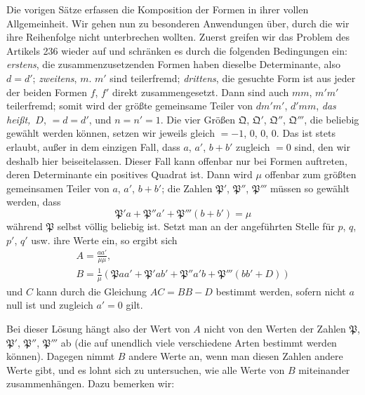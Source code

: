 Die vorigen Sätze erfassen die Komposition der Formen in ihrer vollen Allgemeinheit. Wir gehen nun zu besonderen Anwendungen über, durch die wir ihre Reihenfolge nicht unterbrechen wollten. Zuerst greifen wir das Problem des Artikels 236 wieder auf und schränken es durch die folgenden Bedingungen ein: \textit{erstens}, die zusammenzusetzenden Formen haben dieselbe Determinante, also $d=d'$; \textit{zweitens}, $m$. $m'$ sind teilerfremd; \textit{drittens}, die gesuchte Form ist aus jeder der beiden Formen $f$, $f'$ direkt zusammengesetzt. Dann sind auch $mm$, $m'm'$ teilerfremd; somit wird der größte gemeinsame Teiler von $dm'm'$, $d'mm$, \textit{das heißt,}\ $D$, $=d=d'$, und $n=n'=1$. Die vier Größen $\mathfrak{Q}$, $\mathfrak{Q}'$, $\mathfrak{Q}''$, $\mathfrak{Q}'''$, die beliebig gewählt werden können, setzen wir jeweils gleich $=-1$, $0$, $0$, $0$. Das ist stets erlaubt, außer in dem einzigen Fall, dass $a$, $a'$, $b+b'$ zugleich $=0$ sind, den wir deshalb hier beiseitelassen. Dieser Fall kann offenbar nur bei Formen auftreten, deren Determinante ein positives Quadrat ist. Dann wird $\mu$ offenbar zum größten gemeinsamen Teiler von $a$, $a'$, $b+b'$; die Zahlen $\mathfrak{P}'$, $\mathfrak{P}''$, $\mathfrak{P}'''$ müssen so gewählt werden, dass
\[
\mathfrak{P}'a+\mathfrak{P}''a'+\mathfrak{P}'''(b+b')=\mu
\]
während $\mathfrak{P}$ selbst völlig beliebig ist. Setzt man an der angeführten Stelle für $p$, $q$, $p'$, $q'$ usw. ihre Werte ein, so ergibt sich
\[
\begin{gathered}A=\frac{aa'}{\mu\mu},\\ B=\frac{1}{\mu}(\mathfrak{P}aa'+\mathfrak{P}'ab'+\mathfrak{P}''a'b+\mathfrak{P}'''(bb'+D))\end{gathered}
\]
und $C$ kann durch die Gleichung $AC=BB-D$ bestimmt werden, sofern nicht $a$ null ist und zugleich $a'=0$ gilt.

Bei dieser Lösung hängt also der Wert von $A$ nicht von den Werten der Zahlen $\mathfrak{P}$, $\mathfrak{P}'$, $\mathfrak{P}''$, $\mathfrak{P}'''$ ab (die auf unendlich viele verschiedene Arten bestimmt werden können). Dagegen nimmt $B$ andere Werte an, wenn man diesen Zahlen andere Werte gibt, und es lohnt sich zu untersuchen, wie alle Werte von $B$ miteinander zusammenhängen. Dazu bemerken wir:

